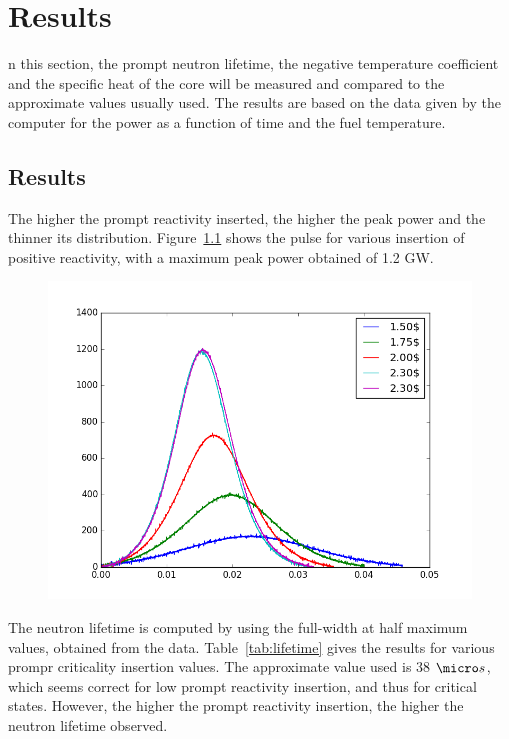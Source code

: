 %
%
\let\textcircled=\pgftextcircled
\chapter{Results}
\label{chap:result}

n this section, the prompt neutron lifetime, the negative temperature coefficient and the specific heat of the core will be measured and compared to the approximate values usually used. The results are based on the data given by the computer for the power as a function of time and the fuel temperature.

\section{Results}

The higher the prompt reactivity inserted, the higher the peak power and the thinner its distribution. Figure~\ref{fig:power} shows the pulse for various insertion of positive reactivity, with a maximum peak power obtained of 1.2 GW.

\begin{figure}[t!]
	\centering
	\includegraphics[height=0.4\textheight]{fig02/power.png}
	\label{fig:power}
\end{figure}


The neutron lifetime is computed by using the full-width at half maximum values, obtained from the data. Table~\ref{tab:lifetime} gives the results for various prompr criticality insertion values. The approximate value used is 38 $\micro s$, which seems correct for low prompt reactivity insertion, and thus for critical states. However, the higher the prompt reactivity insertion, the higher the neutron lifetime observed.

